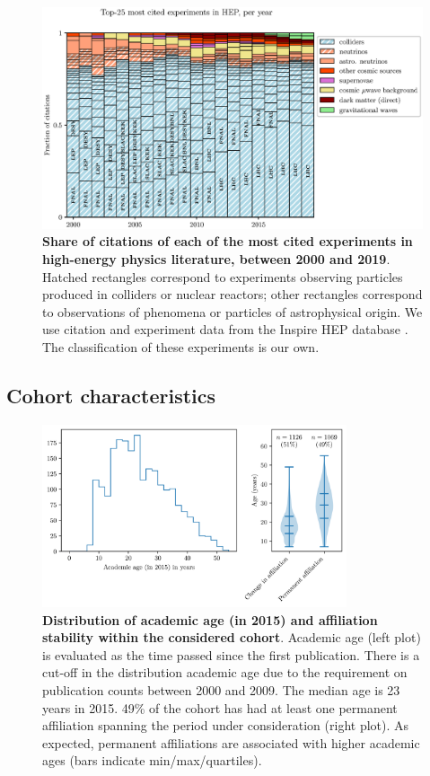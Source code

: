 \documentclass{article}
\begin{document}
\begin{figure}[H]
    \centering
    \includegraphics[width=\textwidth]{plots/experiments.eps}
    \caption{\textbf{Share of citations of each of the most cited experiments in high-energy physics literature, between 2000 and 2019}. Hatched rectangles correspond to experiments observing particles produced in colliders or nuclear reactors; other rectangles correspond to observations of phenomena or particles of astrophysical origin. We use citation and experiment data from the Inspire HEP database \citep{InspireAPI}. The classification of these experiments is our own. }
    \label{fig:experiments}
\end{figure}


\subsection{\label{appendix:sample_characteristics}Cohort characteristics}

\begin{figure}[H]
    \centering
    \includegraphics[width=0.8\textwidth]{plots/sample_characteristics.png}
    \caption{\textbf{Distribution of academic age (in 2015) and affiliation stability within the considered cohort}.  Academic age (left plot) is evaluated as the time passed since the first publication. There is a cut-off in the distribution academic age due to the requirement on publication counts between 2000 and 2009. The median age is 23 years in 2015. 49\% of the cohort has had at least one permanent affiliation spanning the period under consideration (right plot). As expected, permanent affiliations are associated with higher academic ages (bars indicate min/max/quartiles). }
    \label{fig:sample_characteristics}
\end{figure}
\end{document}

